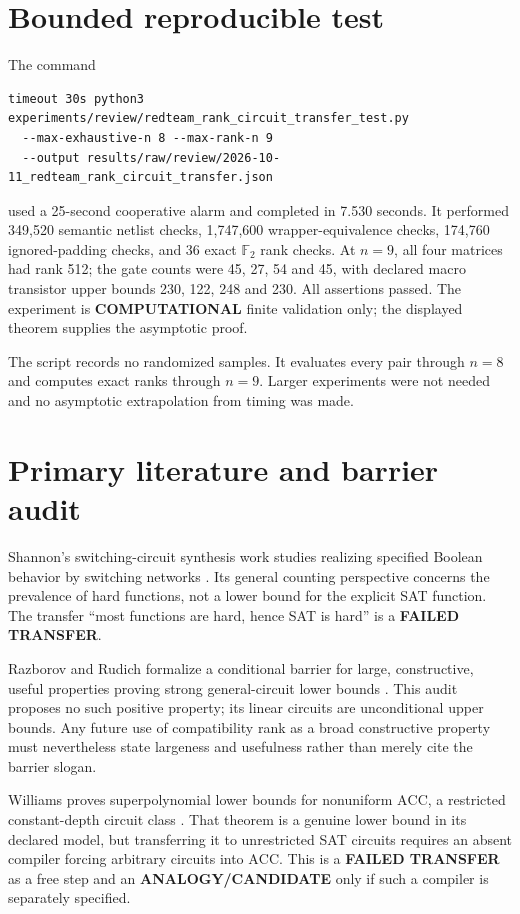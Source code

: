 \documentclass[11pt]{article}
\newcommand{\Ftwo}{\mathbb F_2}
\begin{document}
\section{Bounded reproducible test}
The command
\begin{verbatim}
timeout 30s python3 experiments/review/redteam_rank_circuit_transfer_test.py
  --max-exhaustive-n 8 --max-rank-n 9
  --output results/raw/review/2026-10-11_redteam_rank_circuit_transfer.json
\end{verbatim}
used a 25-second cooperative alarm and completed in 7.530 seconds.  It
performed 349,520 semantic netlist checks, 1,747,600 wrapper-equivalence
checks, 174,760 ignored-padding checks, and 36 exact $\Ftwo$ rank checks.
At $n=9$, all four matrices had rank 512; the gate counts were 45, 27, 54
and 45, with declared macro transistor upper bounds 230, 122, 248 and 230.
All assertions passed.  The experiment is \textbf{COMPUTATIONAL} finite
validation only; the displayed theorem supplies the asymptotic proof.

The script records no randomized samples.  It evaluates every pair through
$n=8$ and computes exact ranks through $n=9$.  Larger experiments were not
needed and no asymptotic extrapolation from timing was made.

\section{Primary literature and barrier audit}
Shannon's switching-circuit synthesis work studies realizing specified
Boolean behavior by switching networks \cite{shannon}.  Its general counting
perspective concerns the prevalence of hard functions, not a lower bound for
the explicit SAT function.  The transfer ``most functions are hard, hence
SAT is hard'' is a \textbf{FAILED TRANSFER}.

Razborov and Rudich formalize a conditional barrier for large, constructive,
useful properties proving strong general-circuit lower bounds
\cite{razborovrudich}.  This audit proposes no such positive property; its
linear circuits are unconditional upper bounds.  Any future use of
compatibility rank as a broad constructive property must nevertheless state
largeness and usefulness rather than merely cite the barrier slogan.

Williams proves superpolynomial lower bounds for nonuniform $\mathrm{ACC}$,
a restricted constant-depth circuit class \cite{williams}.  That theorem is
a genuine lower bound in its declared model, but transferring it to
unrestricted SAT circuits requires an absent compiler forcing arbitrary
circuits into $\mathrm{ACC}$.  This is a \textbf{FAILED TRANSFER} as a free
step and an \textbf{ANALOGY/CANDIDATE} only if such a compiler is separately
specified.
\end{document}
